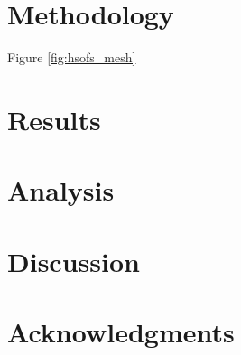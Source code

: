 \documentclass[12pt,english]{article}
\begin{document}
\lipsum[1]

\section{Methodology}

Figure \ref{fig:hsofs_mesh} \lipsum[1-4]

\section{Results}

\lipsum[1-4]

\section{Analysis}

\lipsum[1-5]

\section{Discussion}

\lipsum[1-3]

\newpage{}

\section{Acknowledgments}

\lipsum[1] 


\end{document}
